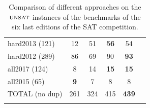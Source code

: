\begin{table}[!htbp]
{{\begin{tabular}{l|ccccc}
    hard2013 (121) & 12 & 51 & \cellcolor{gray!30}\textbf{56} & 54\\
    hard2012 (289) & 86 & 69 & 90 & \cellcolor{gray!30}\textbf{93}\\
    \hline
    all2017 (124) & 8 & 14 & \cellcolor{gray!30}\textbf{15} & \cellcolor{gray!30}\textbf{15}\\
    all2015 (65) & \cellcolor{gray!30}\textbf{9} & 7 & 8 & 8\\
    \hline
    TOTAL (no dup) & 261 & 324 & 415 & \cellcolor{gray!30}\textbf{439}\\
    \label{table:unsat:bliss}
   \end{tabular}
  }
 }
 \vspace*{0.1cm}
 \caption{Comparison of different approaches on the $\textsc{unsat}$ instances of the benchmarks of the six last editions of the SAT competition.}
 \label{table:benchUNSAT}
\end{table}
